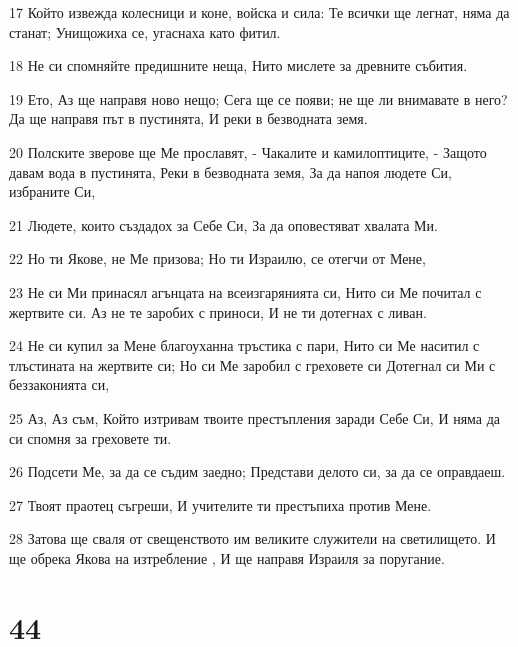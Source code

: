 \par 17 Който извежда колесници и коне, войска и сила: Те всички ще легнат, няма да станат; Унищожиха се, угаснаха като фитил.
\par 18 Не си спомняйте предишните неща, Нито мислете за древните събития.
\par 19 Ето, Аз ще направя ново нещо; Сега ще се появи; не ще ли внимавате в него? Да ще направя път в пустинята, И реки в безводната земя.
\par 20 Полските зверове ще Ме прославят, - Чакалите и камилоптиците, - Защото давам вода в пустинята, Реки в безводната земя, За да напоя людете Си, избраните Си,
\par 21 Людете, които създадох за Себе Си, За да оповестяват хвалата Ми.
\par 22 Но ти Якове, не Ме призова; Но ти Израилю, се отегчи от Мене,
\par 23 Не си Ми принасял агънцата на всеизгарянията си, Нито си Ме почитал с жертвите си. Аз не те заробих с приноси, И не ти дотегнах с ливан.
\par 24 Не си купил за Мене благоуханна тръстика с пари, Нито си Ме наситил с тлъстината на жертвите си; Но си Ме заробил с греховете си Дотегнал си Ми с беззаконията си,
\par 25 Аз, Аз съм, Който изтривам твоите престъпления заради Себе Си, И няма да си спомня за греховете ти.
\par 26 Подсети Ме, за да се съдим заедно; Представи делото си, за да се оправдаеш.
\par 27 Твоят праотец съгреши, И учителите ти престъпиха против Мене.
\par 28 Затова ще сваля от свещенството им великите служители на светилището. И ще обрека Якова на изтребление , И ще направя Израиля за поругание.

\chapter{44}

